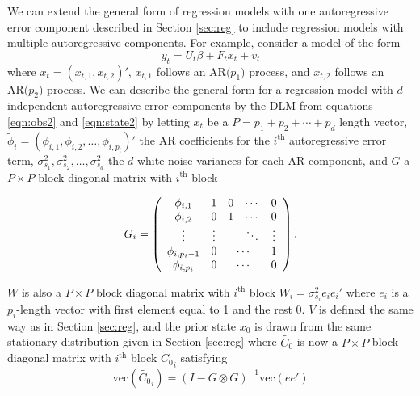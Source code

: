 \documentclass{article}
\begin{document}
We can extend the general form of regression models with one autoregressive error component described in Section \ref{sec:reg} to include regression models with multiple autoregressive components. For example, consider a model of the form \[y_t = U_t\beta + F_tx_t + v_t\] where $x_t = (x_{t,1},x_{t,2})'$, $x_{t,1}$ follows an $\mbox{AR(}p_1\mbox{)}$ process, and $x_{t,2}$ follows an $\mbox{AR(}p_2\mbox{)}$ process. We can describe the general form for a regression model with $d$ independent autoregressive error components by the DLM from equations \eqref{eqn:obs2} and \eqref{eqn:state2} by letting $x_t$ be a $P = p_1 + p_2 + \cdots + p_d$ length vector, $\tilde{\phi}_i = (\phi_{i,1},\phi_{i,2},\ldots,\phi_{i,p_i})'$ the AR coefficients for the $i^{\mbox{th}}$ autoregressive error term, $\sigma^2_{s_1}, \sigma^2_{s_2}, \ldots, \sigma^2_{s_d}$ the $d$ white noise variances for each AR component, and $G$ a $P \times P$ block-diagonal matrix with $i^{\mbox{th}}$ block

\[G_i = \left(
\begin{array}{ccccc}
\phi_{i,1} & 1 & 0 & \cdots & 0 \\
\phi_{i,2} & 0 & 1 & \cdots & 0 \\
\vdots & \vdots & & \ddots & \vdots \\
\phi_{i,p_i-1} & 0 & \multicolumn{2}{c}{\cdots} & 1 \\
\phi_{i,p_i} & 0 & \multicolumn{2}{c}{\cdots} & 0
\end{array}
\right).\]

\noindent $W$ is also a $P\times P$ block diagonal matrix with $i^{\mbox{th}}$ block $W_i = \sigma^2_{s_i}e_ie_i'$ where $e_i$ is a $p_i$-length vector with first element equal to 1 and the rest 0. $V$ is defined the same way as in Section  \ref{sec:reg}, and the prior state $x_0$ is drawn from the same stationary distribution given in Section \ref{sec:reg} where $\tilde{C_0}$ is now a $P\times P$ block diagonal matrix with $i^{\mbox{th}}$ block $\tilde{C_0}_i$ satisfying \[\mbox{vec}({\tilde{C_0}_i}) = (I - G \otimes G)^{-1}\mbox{vec}(ee')\]

\clearpage



\end{document}
